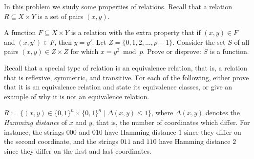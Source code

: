 \documentclass[12pt,oneside]{article}
\begin{document}
%
\begin{problem}{15}
In this problem we study some properties of relations. Recall that a relation $R \subseteq X \times Y$ is a set of pairs $(x,y)$.

\bparts 
{} A function $F \subseteq X \times Y$ is a relation with the extra property that if $(x,y) \in F$ and $(x, y') \in F$, then $y = y'$. Let $Z = \{0, 1, 2, \ldots, p-1\}$. Consider the set $S$ of all pairs $(x,y) \in Z \times Z$ for which $x = y^2 \bmod p$. Prove or disprove: $S$ is a function.


Recall that a special type of relation is an equivalence relation, that is, a relation that is reflexive, symmetric, and transitive. For each of the following, either prove that it is an equivalence relation and state its equivalence classes, or give an example of why it is not an equivalence relation.

 $R:= \{(x, y) \in \{0,1\}^n \times \{0,1\}^n \mid \Delta(x,y) \leq 1\}$, where $\Delta(x,y)$ denotes the {\it Hamming distance} of $x$ and $y$, that is, the number of coordinates which differ. For instance, the strings $000$ and $010$ have Hamming distance $1$ since they differ on the second coordinate, and the strings $011$ and $110$ have Hamming distance $2$ since they differ on the first and last coordinates.


\eparts
\end{problem}
\end{document}
